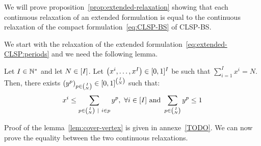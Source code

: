 We will prove proposition~\cref{prop:extended-relaxation} showing that each continuous relaxation of an extended formulation is equal to the continuous relaxation of the compact formulation~\eqref{eq:CLSP-BS} of CLSP-BS.


We start with the relaxation of the extended formulation~\eqref{eq:extended-CLSP:periods} and we need the following lemma.

\begin{lem}\label{lem:cover-vertex}
Let $I\in\mathbb{N}^*$ and let $N\in\range{I}$.
Let $\bracket{x^i,\ldots,x^I}\in\sqbracket{0,1}^I$ be such that $\sum_{i=1}^I x^i = N$.
Then, there exists $\bracket{y^p}_{p\in{I\choose N}}\in\sqbracket{0,1}^{I\choose N}$ such that:
\begin{equation}
  x^i \le \sum_{p\in{I\choose N}~|~i\in p}y^p,\ \forall i\in\range{I}\ \mbox{and}\ \sum_{p\in{I\choose N}}y^p \le 1
\end{equation}
\end{lem}


Proof of the lemma~\cref{lem:cover-vertex} is given in annexe~\cref{TODO}. We can now prove the equality between the two continuous relaxations.


